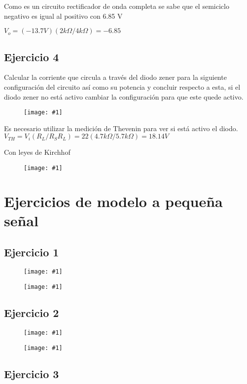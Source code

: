 \documentclass{mylib/reporteCorto}
\newcommand{\insertImage}[2]{
	\begin{figure}[H]
		\centering
		\texttt{[image: \#1]}
	\end{figure}
}
\begin{document}
Como es un circuito rectificador de onda completa se sabe que el semiciclo negativo es
igual al positivo con 6.85 V

$V_o = (-13.7 V)(2k\Omega / 4k \Omega) = -6.85$\\

\subsection{Ejercicio 4}

Calcular la corriente que circula
a través del diodo zener para la
siguiente
configuración
del
circuito así como su potencia y
concluir respecto a esta, si el
diodo zener no está activo
cambiar la configuración para
que este quede activo.

\insertImage{img/dispos_serie2/appdiodo4}{10}

Es necesario utilizar la medición de Thevenin para ver si está activo el diodo.\\

$V_{TH} = V_i (R_L / R_S R_L) = 22(4.7 k\Omega / 5.7 k\Omega) = 18.14 V$

Con leyes de Kirchhof

\insertImage{img/dispos_serie2/sol_appdiodo4}{10}



\section{Ejercicios de modelo a pequeña señal}

\subsection{Ejercicio 1}

\insertImage{img/dispos_serie2/seg_peque1}{15}

\insertImage{img/dispos_serie2/sol_seg_peque1}{10}

\subsection{Ejercicio 2}

\insertImage{img/dispos_serie2/seg_peque2}{15}

\insertImage{img/dispos_serie2/sol_seg_peque2}{10}

\subsection{Ejercicio 3}
\end{document}
